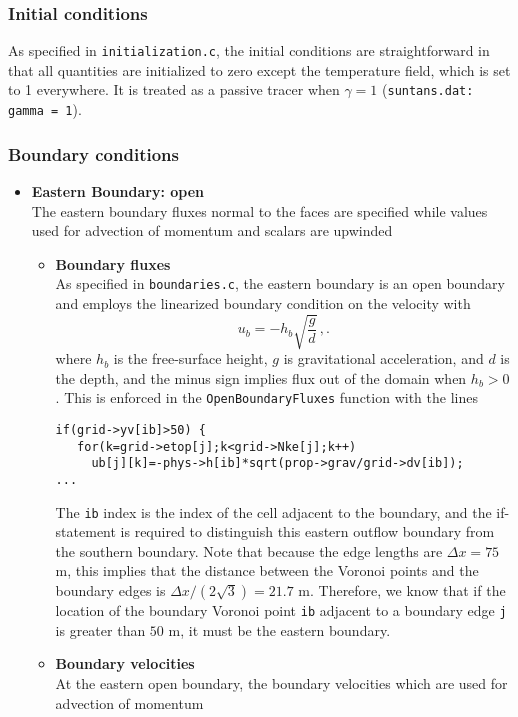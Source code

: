 \subsubsection{Initial conditions}

As specified in \verb+initialization.c+, the initial conditions are straightforward in
that all quantities are initialized to zero except the temperature field, which is set to 1
everywhere.  It is treated as a passive
tracer when $\gamma=1$ (\verb+suntans.dat: gamma = 1+).

\subsubsection{Boundary conditions}

\begin{itemize}
\item[] {\bf Eastern Boundary: open}\\
The eastern boundary fluxes normal to the faces are specified while values used for
advection of momentum and scalars are upwinded
\begin{itemize}
\item[] {\bf Boundary fluxes}\\
As specified in \verb+boundaries.c+, the eastern boundary is an open boundary and employs the
linearized boundary condition on the velocity with
\[ u_b = -h_b\sqrt{\frac{g}{d}} \,,.\]
where $h_b$ is the free-surface height, $g$ is gravitational acceleration, and $d$ is
the depth, and the minus sign implies flux out of the domain when $h_b>0$.
This is enforced in the \verb+OpenBoundaryFluxes+ function with the lines
\begin{verbatim}
if(grid->yv[ib]>50) {
   for(k=grid->etop[j];k<grid->Nke[j];k++) 
     ub[j][k]=-phys->h[ib]*sqrt(prop->grav/grid->dv[ib]);
...
\end{verbatim}
The \verb+ib+ index is the index of the cell adjacent to the boundary, and the if-statement
is required to distinguish this eastern outflow boundary from the southern boundary.  Note
that because the edge lengths are $\Delta x = 75$ m, this implies that the distance between the Voronoi points
and the boundary edges is $\Delta x/(2\sqrt{3})=21.7$ m.  Therefore, we know that if the location
of the boundary Voronoi point \verb+ib+ adjacent to a boundary edge \verb+j+ 
is greater than $50$ m, it must be the eastern boundary.
\item[] {\bf Boundary velocities}\\
At the eastern open boundary, the boundary velocities which are used for advection of momentum

\end{itemize}
\end{itemize}
